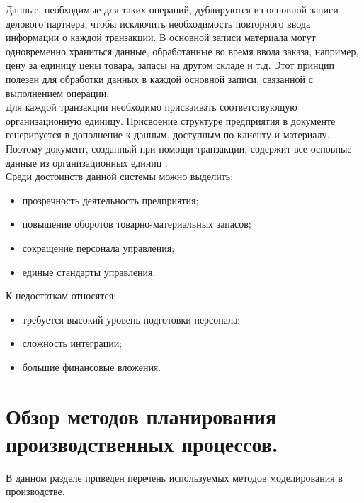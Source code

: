 Данные, необходимые для таких операций, дублируются из основной записи делового партнера, чтобы исключить необходимость повторного ввода информации о каждой транзакции. 
В основной записи материала могут одновременно храниться данные, обработанные во время ввода заказа, например, цену за единицу цены товара, запасы на другом складе и т.д. 
Этот принцип полезен для обработки данных в каждой основной записи, связанной с выполнением операции.\\
\indent Для каждой транзакции необходимо присваивать соответствующую организационную единицу. 
Присвоение структуре предприятия в документе генерируется в дополнение к данным, доступным по клиенту и материалу. 
Поэтому документ, созданный при помощи транзакции, содержит все основные данные из организационных единиц \cite{gehBook}.\\
\indent Среди достоинств данной системы можно выделить:

\begin{itemize}
	\item прозрачность деятельность предприятия;
	\item повышение оборотов товарно-материальных запасов;
	\item сокращение персонала управления;
	\item единые стандарты управления.
\end{itemize}

\indent К недостаткам относятся:

\begin{itemize}
	\item требуется высокий уровень подготовки персонала;
	\item сложность интеграции;
	\item большие финансовые вложения.
\end{itemize}


\section{Обзор методов планирования производственных процессов.}

В данном разделе приведен перечень используемых методов моделирования в производстве.

